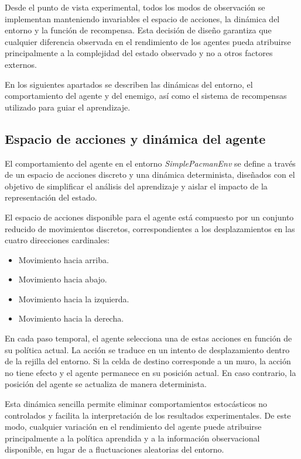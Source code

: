 Desde el punto de vista experimental, todos los modos de observación se implementan manteniendo invariables el espacio de acciones, la dinámica del entorno y la función de recompensa. Esta decisión de diseño garantiza que cualquier diferencia observada en el rendimiento de los agentes pueda atribuirse principalmente a la complejidad del estado observado y no a otros factores externos.

En los siguientes apartados se describen las dinámicas del entorno, el comportamiento del agente y del enemigo, así como el sistema de recompensas utilizado para guiar el aprendizaje.

\subsection{Espacio de acciones y dinámica del agente}

El comportamiento del agente en el entorno \textit{SimplePacmanEnv} se define a través de un espacio de acciones discreto y una dinámica determinista, diseñados con el objetivo de simplificar el análisis del aprendizaje y aislar el impacto de la representación del estado.

El espacio de acciones disponible para el agente está compuesto por un conjunto reducido de movimientos discretos, correspondientes a los desplazamientos en las cuatro direcciones cardinales:
\begin{itemize}
    \item Movimiento hacia arriba.
    \item Movimiento hacia abajo.
    \item Movimiento hacia la izquierda.
    \item Movimiento hacia la derecha.
\end{itemize}

En cada paso temporal, el agente selecciona una de estas acciones en función de su política actual. La acción se traduce en un intento de desplazamiento dentro de la rejilla del entorno. Si la celda de destino corresponde a un muro, la acción no tiene efecto y el agente permanece en su posición actual. En caso contrario, la posición del agente se actualiza de manera determinista.

Esta dinámica sencilla permite eliminar comportamientos estocásticos no controlados y facilita la interpretación de los resultados experimentales. De este modo, cualquier variación en el rendimiento del agente puede atribuirse principalmente a la política aprendida y a la información observacional disponible, en lugar de a fluctuaciones aleatorias del entorno.


